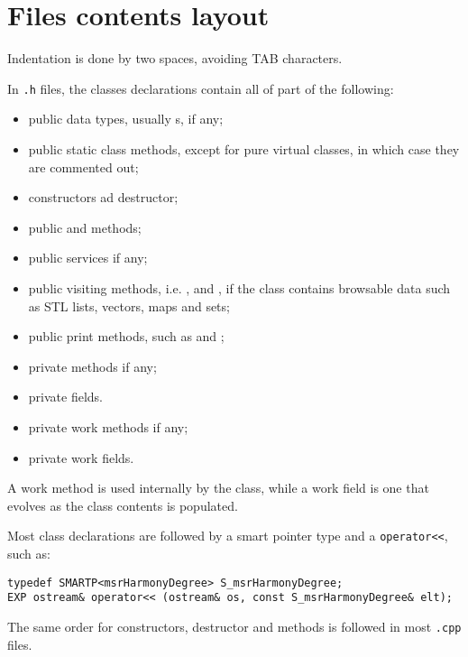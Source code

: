 \section{Files contents layout}

Indentation is done by two spaces, avoiding TAB characters.

In {\tt *.h} files, the classes declarations contain all of part of the following:
\begin{itemize}
\item public data types, usually \enumType s, if any;
\item public static class  methods, except for pure virtual classes, in which case they are commented out;
\item constructors ad destructor;
\item public  and  methods;
\item public services if any;
\item public visiting methods, i.e. ,  and , if the class contains browsable data such as STL lists, vectors, maps and sets;
\item public print methods, such as  and ;
\item private methods if any;
\item private fields.
\item private work methods if any;%
\item private work fields.
\end{itemize}

A work method is used internally by the class, while a work field is one that evolves as the class contents is populated.

Most class declarations are followed by a smart pointer type and a {\tt operator<<}, such as:
\begin{lstlisting}[language=CPlusPlus]
typedef SMARTP<msrHarmonyDegree> S_msrHarmonyDegree;
EXP ostream& operator<< (ostream& os, const S_msrHarmonyDegree& elt);
\end{lstlisting}

The same order for constructors, destructor and methods is followed in most {\tt .cpp} files.


